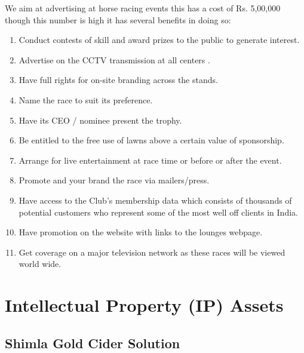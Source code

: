\documentclass[11pt]{article}
\begin{document}
We aim at advertising at horse racing events this has a cost of Rs. 5,00,000 though this number is high it has several benefits in doing so:
\begin{enumerate}
\item Conduct contests of skill and award prizes to the public to generate interest. 
\item Advertise on the CCTV transmission at all centers .
\item Have full rights for on-site branding across the stands.
\item Name the race to suit its preference.
\item Have its CEO / nominee present the trophy.
\item Be entitled to the free use of lawns above a certain value of sponsorship.
\item Arrange for live entertainment at race time or before or after the event.
\item Promote and your brand the race via mailers/press.
\item Have access to the Club's membership data which consists of thousands of potential customers who represent some of the most well off clients in India.
\item Have promotion on the website with links to the lounges webpage.
\item Get coverage on a major television network as these races will be viewed world wide.
\end{enumerate}
\newpage
\section{Intellectual Property (IP) Assets}
  \subsection{Shimla Gold Cider Solution}
\end{document}
